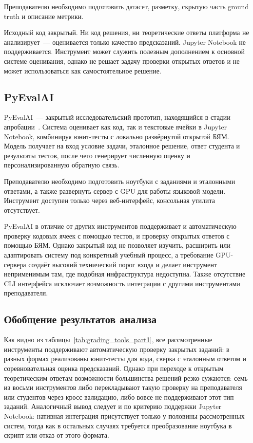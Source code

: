 Преподавателю необходимо подготовить датасет, разметку, скрытую часть
ground truth и описание метрики. 

Исходный код закрытый. Ни код решения, ни теоретические ответы платформа не
анализирует~--- оценивается только качество предсказаний. Jupyter Notebook не
поддерживается. Инструмент может служить полезным дополнением к основной системе
оценивания, однако не решает задачу проверки открытых ответов и не может
использоваться как самостоятельное решение.

\subsection{PyEvalAI}

PyEvalAI~--- закрытый исследовательский прототип, находящийся в стадии
апробации~\cite{pyevalai}. Система оценивает как код, так и текстовые ячейки в
Jupyter Notebook, комбинируя юнит-тесты с локально развёрнутой открытой БЯМ.
Модель получает на вход условие задачи, эталонное решение, ответ студента и
результаты тестов, после чего генерирует численную оценку и персонализированную
обратную связь. 

Преподавателю необходимо подготовить ноутбуки с заданиями и эталонными ответами,
а также развернуть сервер с GPU для работы языковой модели. Инструмент доступен только
через веб-интерфейс, консольная утилита отсутствует.

PyEvalAI в отличие от других инструментов поддерживает и автоматическую проверку кодовых ячеек
с помощью тестов, и проверку открытых ответов с помощью БЯМ. 
Однако закрытый код не позволяет изучить, расширить или адаптировать систему
под конкретный учебный процесс, а требование GPU-сервера создаёт высокий
технический порог входа и делает инструмент неприменимым там, где подобная
инфраструктура недоступна. Также отсутствие CLI интерфейса исключает возможность интеграции
с другими инструментами преподавателя.

\subsection{Обобщение результатов анализа}

Как видно из таблицы~\ref{tab:grading_tools_part1}, все рассмотренные
инструменты поддерживают автоматическую проверку закрытых заданий: в разных
формах реализованы юнит-тесты для кода, сверка с эталонным ответом и
соревновательная оценка предсказаний. Однако при
переходе к открытым теоретическим ответам возможности большинства решений резко
сужаются: семь из восьми инструментов либо перекладывают такую проверку на
преподавателя или студентов через кросс-валидацию, либо вовсе не поддерживают
этот тип заданий. Аналогичный вывод следует и по критерию поддержки Jupyter
Notebook: нативная интеграция присутствует только у половины рассмотренных
систем, тогда как в остальных случаях требуется преобразование ноутбука в
скрипт или отказ от этого формата.

